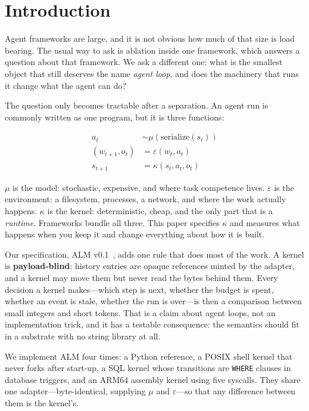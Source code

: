 \documentclass[11pt,a4paper]{article}
\begin{document}
\section{Introduction}

Agent frameworks are large, and it is not obvious how much of that size is load
bearing. The usual way to ask is ablation inside one framework, which answers a
question about that framework. We ask a different one: what is the smallest
object that still deserves the name \emph{agent loop}, and does the machinery
that runs it change what the agent can do?

The question only becomes tractable after a separation. An agent run is
commonly written as one program, but it is three functions:

\begin{align}
a_t         &\sim \mu(\mathrm{serialize}(s_t)) \label{eq:mu}\\
(w_{t+1}, o_t) &= \varepsilon(w_t, a_t)        \label{eq:eps}\\
s_{t+1}     &= \kappa(s_t, a_t, o_t)           \label{eq:kappa}
\end{align}

$\mu$ is the model: stochastic, expensive, and where task competence lives.
$\varepsilon$ is the environment: a filesystem, processes, a network, and where
the work actually happens. $\kappa$ is the kernel: deterministic, cheap, and
the only part that is a \emph{runtime}. Frameworks bundle all three. This paper
specifies $\kappa$ and measures what happens when you keep it and change
everything about how it is built.

Our specification, ALM v0.1~\cite{almspec}, adds one rule that does most of the
work. A kernel is \textbf{payload-blind}: history entries are opaque references
minted by the adapter, and a kernel may move them but never read the bytes
behind them. Every decision a kernel makes---which step is next, whether the
budget is spent, whether an event is stale, whether the run is over---is then a
comparison between small integers and short tokens. That is a claim about agent
loops, not an implementation trick, and it has a testable consequence: the
semantics should fit in a substrate with no string library at all.

We implement ALM four times: a Python reference, a POSIX shell kernel that
never forks after start-up, a SQL kernel whose transitions are \texttt{WHERE}
clauses in database triggers, and an ARM64 assembly kernel using five
syscalls. They share one adapter---byte-identical, supplying $\mu$ and
$\varepsilon$---so that any difference between them is the kernel's.
\end{document}
